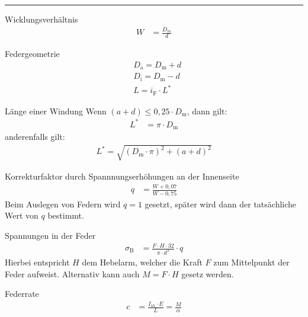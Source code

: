 \hrule
\begin{eeqn}{Wicklungsverhältnis}
	\begin{align}
		W &= \frac{D_m}{d}
	\end{align}
\end{eeqn}

\begin{eeqn}{Federgeometrie}
	\label{sec:federgeometrie-drehfedern}
	\begin{align}
		& D_\text{a} = D_\text{m} + d \\
		& D_\text{i} = D_\text{m} - d \\
		& L = i_\text{F} \cdot L^*
	\end{align}
\end{eeqn}

\begin{eeqn}{Länge einer Windung}
	Wenn $(a+d) \leq 0,25\cdot D_\text{m}$, dann gilt:
	\begin{align}
         L^* &= \pi \cdot D_\text{m}
    \end{align}
    anderenfalls gilt:
    \begin{align}
    	L^* = \sqrt{(D_\text{m}\cdot\pi)^2+(a+d)^2}
    \end{align}
\end{eeqn}

\begin{eeqn}{Korrekturfaktor durch Spannnungserhöhungen an der Innenseite}
	\begin{align}
		q & = \frac{W+0,07}{W-0,75}
	\end{align}
	Beim Auslegen von Federn wird $q=1$ gesetzt, später wird dann der tatsächliche Wert von $q$ bestimmt.
\end{eeqn}

\begin{eeqn}{Spannungen in der Feder}
	\begin{align}
		\sigma_\text{B} & = \frac{F\cdot H \cdot 32}{\pi \cdot d^3} \cdot q
	\end{align}
	Hierbei entspricht $H$ dem Hebelarm, welcher die Kraft $F$ zum Mittelpunkt der Feder aufweist. Alternativ kann auch $M = F\cdot H$ gesetz werden.
\end{eeqn}

\begin{eeqn}{Federrate}
	\begin{align}
		c & = \frac{I_\text{ax}\cdot E}{L} = \frac{M}{\alpha}
	\end{align}
\end{eeqn}

